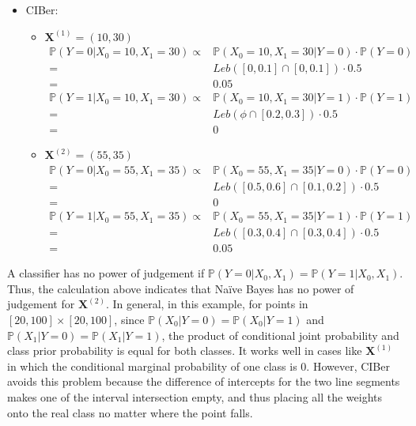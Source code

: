 \documentclass[twoside,11pt]{article}
\begin{document}
\begin{itemize}
    \item CIBer:
    \begin{itemize}
    \item{$\mathbf{X}^{(1)}=(10,30)$}
     \begin{equation*}
     \begin{aligned}
      \mathbb{P}(Y=0|X_0=10, X_1=30)\propto&\mathbb{P}(X_0=10,X_1=30|Y=0)\cdot \mathbb{P}(Y=0)\\
     =&Leb([0,0.1]\cap[0,0.1])\cdot0.5\\
     =&0.05
     \end{aligned}
     \end{equation*}
     \begin{equation*}
     \begin{aligned}
      \mathbb{P}(Y=1|X_0=10, X_1=30)\propto&\mathbb{P}(X_0=10,X_1=30|Y=1)\cdot\mathbb{P}(Y=1)\\
     =&Leb(\phi\cap[0.2,0.3])\cdot0.5\\
     =&0
     \end{aligned}
     \end{equation*}

    \item{$\mathbf{X}^{(2)}=(55,35)$}
     \begin{equation*}
     \begin{aligned}
      \mathbb{P}(Y=0|X_0=55, X_1=35)\propto&\mathbb{P}(X_0=55,X_1=35|Y=0)\cdot\mathbb{P}(Y=0)\\
     =&Leb([0.5,0.6]\cap[0.1,0.2])\cdot0.5\\
     =&0
     \end{aligned}
     \end{equation*}
     \begin{equation*}
     \begin{aligned}
      \mathbb{P}(Y=1|X_0=55, X_1=35)\propto&\mathbb{P}(X_0=55,X_1=35|Y=1)\cdot\mathbb{P}(Y=1)\\
     =&Leb([0.3,0.4]\cap[0.3,0.4])\cdot0.5\\
     =&0.05
     \end{aligned}
     \end{equation*}
    \end{itemize}
\end{itemize}

A classifier has no power of judgement if $\mathbb{P}(Y=0|X_0,X_1)=\mathbb{P}(Y=1|X_0,X_1)$. Thus, the calculation above indicates that Na\"ive Bayes has no power of judgement for $\mathbf{X}^{(2)}$. In general, in this example, for points in $[20,100]\times[20,100]$, since $\mathbb{P}(X_0|Y=0)=\mathbb{P}(X_0|Y=1)$ and $\mathbb{P}(X_1|Y=0)=\mathbb{P}(X_1|Y=1)$, the product of conditional joint probability and class prior probability is equal for both classes. It works well in cases like $\mathbf{X}^{(1)}$ in which the conditional marginal probability of one class is $0$. However, CIBer avoids this problem because the difference of intercepts for the two line segments makes one of the interval intersection empty, and thus placing all the weights onto the real class no matter where the point falls.
\end{document}
